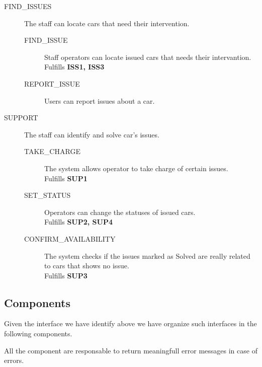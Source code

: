 \documentclass[11pt]{article} %
\begin{document}
\begin{description}
	\item[FIND\_ISSUES] The staff can locate cars that need their intervention. \hfill {\color{red}{Missing ISS2, ISS4}}
		\begin{description}
			\item[FIND\_ISSUE] Staff operators can locate issued cars that needs their intervantion. \\ Fulfills \textbf{ISS1, ISS3}
			\item[REPORT\_ISSUE] Users can report issues about a car.  {\color{red}{No matching req. found .-.}}
		\end{description}

	\item[SUPPORT] The staff can identify and solve car’s issues. \hfill {\color{red}{Add CONFIRM\_AVAILABILITY}}
		\begin{description}
			\item[TAKE\_CHARGE] The system allows operator to take charge of certain issues. \\ Fulfills \textbf{SUP1}
			\item[SET\_STATUS] Operators can change the statuses of issued cars. \\ Fulfills \textbf{SUP2, SUP4}
			\item[CONFIRM\_AVAILABILITY] The system checks if the issues marked as Solved are really related to cars that shows no issue. \\ Fulfills \textbf{SUP3}
		\end{description}
\end{description}



\subsection{Components}

Given the interface we have identify above we have organize such interfaces in the following components.

All the component are responsable to return meaningfull error messages in case of errors.
\end{document}

